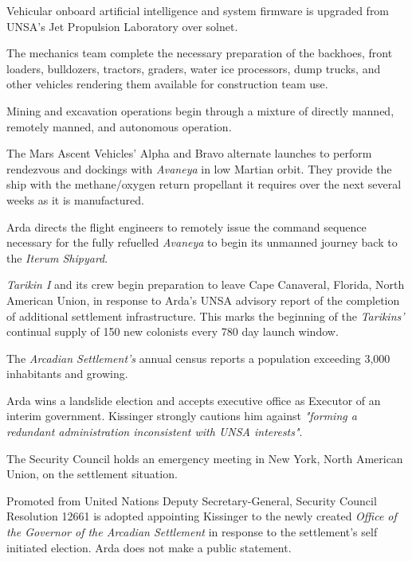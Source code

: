 Vehicular onboard artificial intelligence and system firmware is upgraded from UNSA's Jet Propulsion Laboratory over solnet.

The mechanics team complete the necessary preparation of the backhoes, front loaders, bulldozers, tractors, graders, water ice processors, dump trucks, and other vehicles rendering them available for construction team use.

Mining and excavation operations begin through a mixture of directly manned, remotely manned, and autonomous operation.
\StopTimelineDate

The Mars Ascent Vehicles' Alpha and Bravo alternate launches to perform rendezvous and dockings with {\it Avaneya} in low Martian orbit. They provide the ship with the methane/oxygen return propellant it requires over the next several weeks as it is manufactured.
\StopTimelineDate

Arda directs the flight engineers to remotely issue the command sequence necessary for the fully refuelled {\it Avaneya} to begin its unmanned journey back to the {\it Iterum Shipyard}.
\StopTimelineDate

{\it Tarikin I} and its crew begin preparation to leave Cape Canaveral, Florida, North American Union, in response to Arda's UNSA advisory report of the completion of additional settlement infrastructure. This marks the beginning of the {\it Tarikins'} continual supply of 150 new colonists every 780 day launch window.
\StopTimelineDate

The {\it Arcadian Settlement's} annual census reports a population exceeding 3,000 inhabitants and growing.
\StopTimelineDate

Arda wins a landslide election and accepts executive office as Executor of an interim government. Kissinger strongly cautions him against {\it "forming a redundant administration inconsistent with UNSA interests"}. 

The Security Council holds an emergency meeting in New York, North American Union, on the settlement situation.
\StopTimelineDate

Promoted from United Nations Deputy Secretary-General, Security Council Resolution 12661 is adopted appointing Kissinger to the newly created {\it Office of the Governor of the Arcadian Settlement} in response to the settlement's self initiated election. Arda does not make a public statement.
\StopTimelineDate

